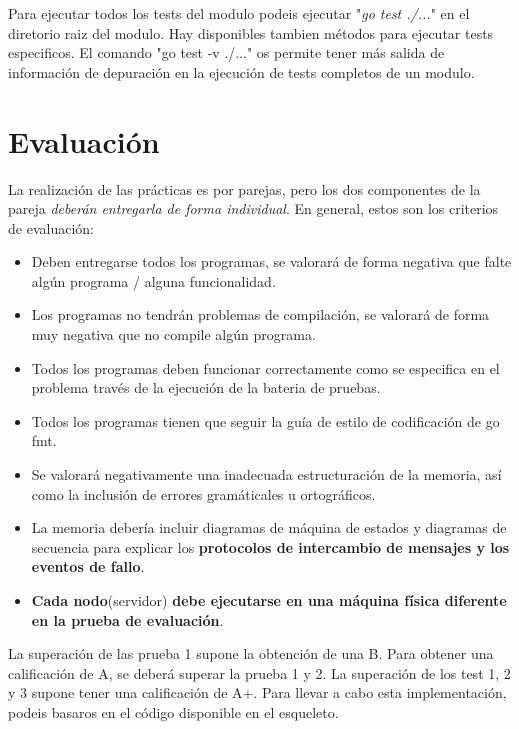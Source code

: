 \documentclass{unizarpractice}
\begin{document}
Para ejecutar todos los tests del modulo podeis ejecutar "\textit{go test  ./...}" en el diretorio raiz del modulo. Hay disponibles tambien métodos para ejecutar tests especificos. El comando "go test -v ./..." os permite tener más salida de información de depuración en la ejecución de tests completos de un modulo.


\section{Evaluación}
La realización de las prácticas es por parejas, pero los dos componentes de la pareja  \emph{deberán entregarla de forma individual}. En general, estos son los criterios de evaluación:
\begin{itemize}[topsep=-0.5\baselineskip]
\item Deben entregarse todos los programas, se valorará de forma negativa que falte algún programa / alguna funcionalidad.
\item Los programas no tendrán problemas de compilación, se valorará de forma muy negativa que no compile algún programa. 
\item Todos los programas deben funcionar correctamente como se especifica en el problema través de la ejecución de la bateria de pruebas.
\item Todos los programas tienen que seguir la guía de estilo de codificación de go fmt.
\item Se valorará negativamente una inadecuada estructuración de la memoria, así como la inclusión de errores gramáticales u ortográficos.
\item La memoria debería incluir diagramas de máquina de estados y diagramas de secuencia para explicar los \textbf{protocolos de intercambio de mensajes y los eventos de fallo}.
\item \textbf{Cada nodo}(servidor) \textbf{debe ejecutarse en una máquina física diferente en la prueba de evaluación}.
\end{itemize}

La superación de las prueba 1 supone la obtención de una B.  Para obtener una calificación de A, se deberá superar la prueba 1 y 2. La superación de los test 1, 2 y 3 supone tener una calificación de A+. Para llevar a cabo esta implementación, podeis basaros en el código disponible en el esqueleto.

%
\end{document}
